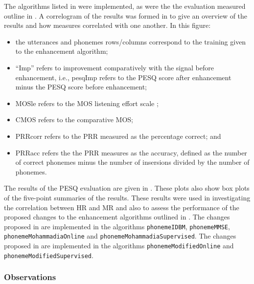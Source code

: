 The algorithms listed in  were implemented,
as were the the evaluation measured outline in .
A correlogram of the results was formed in  to give
an overview of the results and how measures correlated with one another.
In this figure:
\begin{itemize}
\item the utterances and phonemes rows/columns correspond to the training
given to the enhancement algorithm;
\item ``Imp'' refers to improvement comparatively with the signal before
enhancement, i.e., pesqImp refers to the \ac{PESQ} score after enhancement
minus the \ac{PESQ} score before enhancement;
\item MOSle refers to the \ac{MOS} listening effort scale \citep{InternationalTelecommunicationUnion1996};
\item CMOS refers to the comparative \ac{MOS};
\item PRRcorr refers to the \ac{PRR} measured as the percentage correct;
and
\item PRRacc refers the the \ac{PRR} measures as the accuracy, defined
as the number of correct phonemes minus the number of insersions divided
by the number of phonemes.
\end{itemize}
The results of the \ac{PESQ} evaluation are given in .
These plots also show box plots of the five-point summaries of the
results. These results were used in investigating the correlation
between \ac{HR} and \ac{MR} and also to assess the performance of
the proposed changes to the enhancement algorithms outlined in .
The changes proposed in  are implemented
in the algorithms \lstinline[breaklines=true]!phonemeIDBM!, \lstinline[breaklines=true]!phonemeMMSE!,
\lstinline[breaklines=true]!phonemeMohammadiaOnline! and \lstinline[breaklines=true]!phonemeMohammadiaSupervised!.
The changes proposed in  are implemented
in the algorithms \lstinline[breaklines=true]!phonemeModifiedOnline!
and \lstinline[breaklines=true]!phonemeModifiedSupervised!.


\subsubsection*{Observations}

